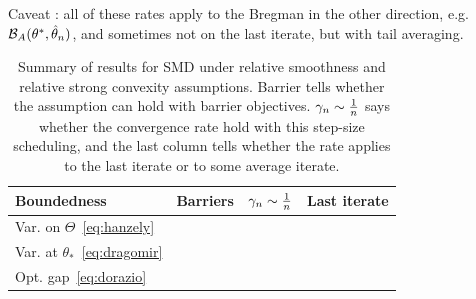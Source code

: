 \documentclass[twoside]{article}
\newcommand*{\expect}[2][]{\ensuremath{\mathbb{E}_{#1} \left[ #2 \right] }} %
\newcommand{\logpart}{A}
\newcommand{\bregman}{\cB_\logpart}
\newcommand{\nat}{\theta}
\newcommand{\m}{\mu}
\newcommand{\lr}{\gamma} %
\newcommand{\MAPt}{\hat \nat_n}
\begin{document}
Caveat : all of these rates apply to the Bregman in the other direction, e.g. $\bregman(\nat^*, \MAPt)$, and sometimes not on the last iterate, but with tail averaging.

\begin{table}[t]
\begingroup
\newcommand*{\greencmark}{\textcolor{Green}{\cmark}}
\newcommand*{\redxmark}{\textcolor{Red}{\xmark}}
\centering
\caption{Summary of results for SMD
under relative smoothness and relative strong convexity assumptions.
Barrier tells whether the assumption can hold with barrier objectives.
$\lr_n \sim \inv{n}$ says whether the convergence rate hold with this step-size scheduling, and the last column tells whether the rate applies to the last iterate or to some average iterate.
}
\begin{tabular}{lccc}
\toprule
Boundedness & Barriers &  $\lr_n \sim \inv{n}$ & Last iterate \\
\midrule
Var. on $\Theta$~\eqref{eq:hanzely} %
& \redxmark & \greencmark  & \redxmark
\\
Var. at $\theta_*$~\eqref{eq:dragomir} %
& \redxmark & \greencmark  & \greencmark
\\
Opt. gap~\eqref{eq:dorazio} %
& \greencmark & \redxmark & \greencmark
\\
\bottomrule
\end{tabular}
\label{tbl:assumptions}
\endgroup
\end{table}
\end{document}
